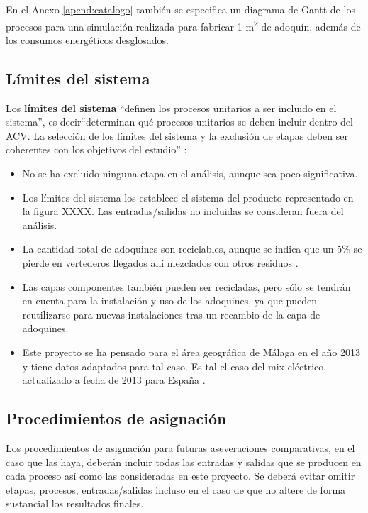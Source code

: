 En el Anexo \ref{apend:catalogo} también se especifica un diagrama de Gantt de los procesos para una simulación realizada para fabricar 1 \si{m^2} de adoquín, además de los consumos energéticos desglosados.

\subsection{Límites del sistema}

Los \textbf{límites del sistema} ``definen los procesos unitarios a ser incluido en el sistema'', es decir``determinan qué procesos unitarios se deben incluir dentro del ACV. La selección de los límites del sistema y la exclusión de etapas deben ser coherentes con los objetivos del estudio'' \cite{iso14040}:

\begin{itemize}
  \item No se ha excluido ninguna etapa en el análisis, aunque sea poco significativa.
  \item Los límites del sistema los establece el sistema del producto representado en la figura XXXX. Las entradas/salidas no incluidas se consideran fuera del análisis.
  \item La cantidad total de adoquines son reciclables, aunque se indica que un 5\% se pierde en vertederos llegados allí mezclados con otros residuos \cite{euroadoquin}.
  \item Las capas componentes también pueden ser recicladas, pero sólo se tendrán en cuenta para la instalación y uso de los adoquines, ya que pueden reutilizarse para nuevas instalaciones tras un recambio de la capa de adoquines.
  \item Este proyecto se ha pensado para el área geográfica de Málaga en el año 2013 y tiene datos adaptados para tal caso. Es tal el caso del mix eléctrico, actualizado a fecha de 2013 para España \cite{mlgceballos}.
\end{itemize}

\subsection{Procedimientos de asignación}
Los procedimientos de asignación para futuras aseveraciones comparativas, en el caso que las haya, deberán incluir todas las entradas y salidas que se producen en cada proceso así como las consideradas en este proyecto. Se deberá evitar omitir etapas, procesos, entradas/salidas incluso en el caso de que no altere de forma sustancial los resultados finales.

